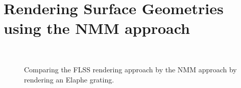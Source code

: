 \section{Rendering Surface Geometries using the NMM approach}
\label{chap:diffflssnmm}

\begin{figure}[H]
  \centering
~
~
\caption[Comparing NMM Approach with FLSS Approach]{Comparing the FLSS rendering approach by the NMM approach by rendering an Elaphe grating.}
\label{fig:appendixflssvsnmm}
\end{figure}

